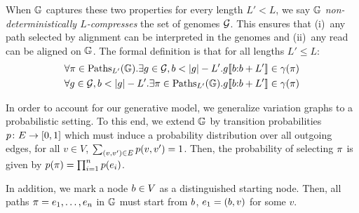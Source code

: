 When $\mathbb{G}$ captures these two properties for every length $L'<L$, we say $\mathbb{G}$ \emph{non-deterministically $L$-compresses} the set of genomes $\mathcal{G}$.
This ensures that (i)~any path selected by alignment can be interpreted in the genomes and (ii)~any read can be aligned on $\mathbb{G}$.
The formal definition is that for all lengths $L' \leq L$:
\begin{align}
	\forall \pi \in \text{Paths}_{L'}(\mathbb{G}). \exists g \in \mathcal{G}, b < \left| g \right|-L'. g \llbracket b {:} b + L' \rrbracket \in \gamma(\pi) \label{eq:compress-non-deterministic-precise} \\
	\forall g \in \mathcal{G}, b < \left| g \right|-L'. \exists \pi \in \text{Paths}_{L'}(\mathbb{G}). g \llbracket b {:} b + L' \rrbracket \in \gamma(\pi) \label{eq:compress-non-deterministic-complete}
\end{align}


In order to account for our generative model, we generalize variation graphs to a probabilistic setting.
To this end, we extend $\mathbb{G}$ by transition probabilities $p \colon E \to [0,1]$ which must induce a probability distribution over all outgoing edges, \ie for all $v \in V$, $\sum_{(v,v') \in E} p(v,v')=1$.
Then, the probability of selecting $\pi$ is given by $p(\pi)=\prod_{i=1}^{n} p(e_i)$.

In addition, we mark a node $b \in V$ as a distinguished starting node.
Then, all paths $\pi=e_1,\dots,e_n$ in $\mathbb{G}$ must start from $b$, \ie $e_1=(b,v)$ for some $v$.

